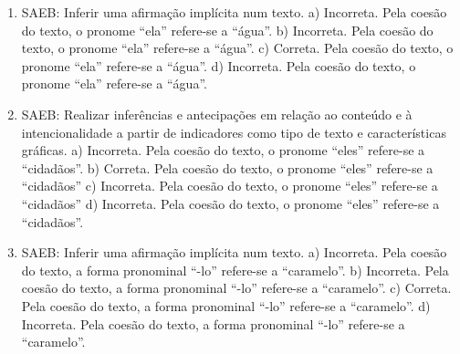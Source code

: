 
\begin{enumerate}
\item
SAEB: Inferir uma afirmação implícita num texto.
a) Incorreta. Pela coesão do texto, o pronome ``ela'' refere-se a
``água''.
b) Incorreta. Pela coesão do texto, o pronome ``ela'' refere-se a
``água''.
c) Correta. Pela coesão do texto, o pronome ``ela'' refere-se a
``água''.
d) Incorreta. Pela coesão do texto, o pronome ``ela'' refere-se a
``água''.

\item
SAEB: Realizar inferências e antecipações em relação ao conteúdo
e à intencionalidade a partir de indicadores como tipo de texto e
características gráficas.
a) Incorreta. Pela coesão do texto, o pronome ``eles'' refere-se a
``cidadãos''.
b) Correta. Pela coesão do texto, o pronome ``eles'' refere-se a
``cidadãos''
c) Incorreta. Pela coesão do texto, o pronome ``eles'' refere-se a
``cidadãos''
d) Incorreta. Pela coesão do texto, o pronome ``eles'' refere-se a
``cidadãos''.

\item
SAEB: Inferir uma afirmação implícita num texto.
a) Incorreta. Pela coesão do texto, a forma pronominal ``-lo'' refere-se a
``caramelo''.
b) Incorreta. Pela coesão do texto, a forma pronominal ``-lo'' refere-se a
``caramelo''.
c) Correta. Pela coesão do texto, a forma pronominal ``-lo'' refere-se a
``caramelo''.
d) Incorreta. Pela coesão do texto, a forma pronominal ``-lo'' refere-se a
``caramelo''.
\end{enumerate}



